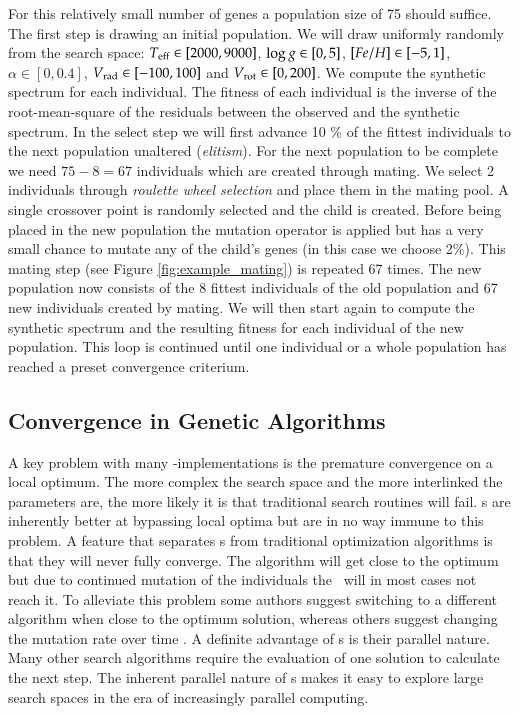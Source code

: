 For this relatively small number of genes a population size of 75 should suffice. The first step is drawing an initial population. We will draw uniformly randomly from the search space: $T_{\rm eff} \in [2000, 9000]$, $\log{g} \in [0, 5]$, $[Fe/H] \in [-5,1]$, $\alpha \in [0,0.4]$, $\hbox{$V_{\textrm{rad}}$} \in [-100, 100]$ and $\hbox{$V_{\textrm{rot}}$} \in [0,200]$. We compute the synthetic spectrum for each individual. The fitness of each individual is the inverse of the root-mean-square of the residuals between the observed and the synthetic spectrum. 
In the select step we will first advance 10 \% of the fittest individuals to the next population unaltered (\textit{elitism}). For the next population to be complete we need $75 - 8 = 67$ individuals which are created through mating. We select 2 individuals through \textit{roulette wheel selection} and place them in the mating pool. A single crossover point is randomly selected and the child is created. Before being placed in the new population the mutation operator is applied but has a very small chance to mutate any of the child's genes (in this case we choose 2\%).
This mating step (see Figure \ref{fig:example_mating}) is repeated 67 times. The new population now consists of the 8 fittest individuals of the old population and 67 new individuals created by mating. We will then start again to compute the synthetic spectrum and the resulting fitness for each individual of the new population. This loop is continued until one individual or a whole population has reached a preset convergence criterium.

\subsection{Convergence in Genetic Algorithms}
A key problem with many \ga-implementations is the premature convergence on a local optimum. The more complex the search space and the more interlinked the parameters are, the more likely it is that traditional search routines will fail. \ga s are inherently better at bypassing local optima but are in no way immune to this problem. A feature that separates \ga s from traditional optimization algorithms is that they will never fully converge. The algorithm will get close to the optimum but due to continued mutation of the individuals the \ga\ will in most cases not reach it. To alleviate this problem some authors suggest switching to a different algorithm when close to the optimum solution, whereas others suggest changing the mutation rate over time \citep[see][and references therein]{citeulike:344183}.
A definite advantage of \ga s is their parallel nature. Many other search algorithms require the evaluation of one solution to calculate the next step. The inherent parallel nature of \ga s makes it easy to explore large search spaces in the era of increasingly parallel computing. 

